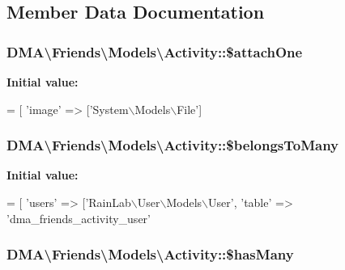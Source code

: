 \subsection{Member Data Documentation}
\hypertarget{classDMA_1_1Friends_1_1Models_1_1Activity_a9911cb733cbc863cc1bdccde254404b5}{
\subsubsection[{\$attach\-One}]{\setlength{\rightskip}{0pt plus 5cm}D\-M\-A\textbackslash{}\-Friends\textbackslash{}\-Models\textbackslash{}\-Activity\-::\$attach\-One}}\label{classDMA_1_1Friends_1_1Models_1_1Activity_a9911cb733cbc863cc1bdccde254404b5}
{\bfseries Initial value\-:}
\begin{DoxyCode}
= [
        \textcolor{stringliteral}{'image'} => [\textcolor{stringliteral}{'System\(\backslash\)Models\(\backslash\)File'}]
\end{DoxyCode}
\hypertarget{classDMA_1_1Friends_1_1Models_1_1Activity_ae5245e6eb74228cd54d8ae77e5a9bb38}{
\subsubsection[{\$belongs\-To\-Many}]{\setlength{\rightskip}{0pt plus 5cm}D\-M\-A\textbackslash{}\-Friends\textbackslash{}\-Models\textbackslash{}\-Activity\-::\$belongs\-To\-Many}}\label{classDMA_1_1Friends_1_1Models_1_1Activity_ae5245e6eb74228cd54d8ae77e5a9bb38}
{\bfseries Initial value\-:}
\begin{DoxyCode}
= [
        \textcolor{stringliteral}{'users'} => [\textcolor{stringliteral}{'RainLab\(\backslash\)User\(\backslash\)Models\(\backslash\)User'}, \textcolor{stringliteral}{'table'} => \textcolor{stringliteral}{'dma\_friends\_activity\_user'}
\end{DoxyCode}
\hypertarget{classDMA_1_1Friends_1_1Models_1_1Activity_a8b255e9889df95f8c702b72ed49ace25}{
\subsubsection[{\$has\-Many}]{\setlength{\rightskip}{0pt plus 5cm}D\-M\-A\textbackslash{}\-Friends\textbackslash{}\-Models\textbackslash{}\-Activity\-::\$has\-Many}}\label{classDMA_1_1Friends_1_1Models_1_1Activity_a8b255e9889df95f8c702b72ed49ace25}
